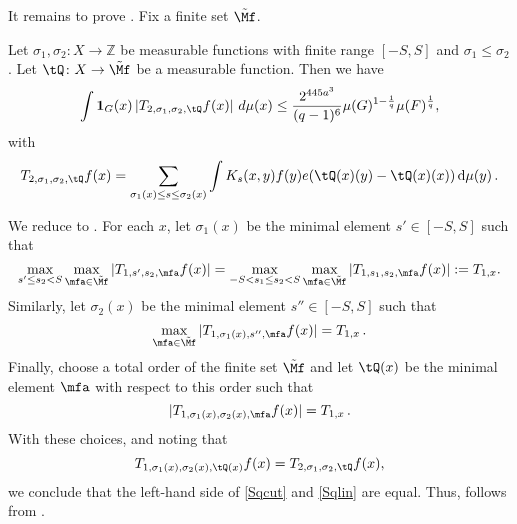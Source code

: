 It remains to prove .
Fix a finite set
$\tilde{\Mf}$.
\begin{lemma}
    \label{linearized-truncation}
    Let $\sigma_1,\sigma_2\colon X\to \mathbb{Z}$ be measurable functions with finite range
    $[-S,S]$ and $\sigma_1\leq \sigma_2$.
    Let $\tQ\colon X\to {\tilde{\Mf}}$ be a measurable function. Then we have
    \begin{equation} \label{Sqlin}
        \int \mathbf{1}_{G}(x)
        \left| {T}_{2,\sigma_1,\sigma_2,\tQ}f(x)\right|\, d\mu(x)
        \le \frac{2^{445a^3}}{(q-1)^6} \mu(G)^{1-\frac{1}{q}} \mu(F)^{\frac{1}{q}},
    \end{equation}
    with
    \begin{equation}\label{middles1}
        {T}_{2,\sigma_1,\sigma_2,\tQ}f(x)=\sum_{\sigma_1(x) \le s\le \sigma_2(x)}
        \int K_s(x,y) f(y) e(\tQ(x)(y) - \tQ(x)(x)) \, \mathrm{d}\mu(y)\,.
    \end{equation}
\end{lemma}

We reduce  to
.
For each $x$, let $\sigma_1(x)$ be the
minimal element $s'\in [-S,S]$ such that
\[\max_{s'\leq s_2<S}\max_{\mfa\in\tilde{\Mf}}
| T_{1, s',s_2,\mfa} f(x)|
=
\max_{-S<s_1\le s_2<S}\max_{\mfa\in\tilde{\Mf}}
| {T}_{1, s_1,s_2,\mfa} f(x)|:={T}_{1, x}.
\]
Similarly, let ${\sigma}_2(x)$ be the
minimal element $s''\in [-S,S]$ such that
\[\max_{\mfa\in\tilde{\Mf}}
| {T}_{1, {\sigma}_1(x), s'',\mfa} f(x)|
=
{T}_{1,x}\,.
\]
Finally, choose a total order of the finite set $\tilde{\Mf}$
and let $\tQ(x)$ be the minimal element $\mfa$ with respect to this order such that
\[
| {T}_{1, {\sigma}_1(x),{\sigma}_2(x),\mfa} f(x)| = {T}_{1,x}\,.
\]
With these choices, and noting that
\begin{equation*}
{T}_{1, {\sigma}_1(x),{\sigma}_2(x),\tQ(x)} f(x)={T}_{2, {\sigma}_1,{\sigma}_2,\tQ} f(x),
\end{equation*}
we conclude that the left-hand side of \eqref{Sqcut}
and \eqref{Sqlin} are equal. Thus, 
follows from .

